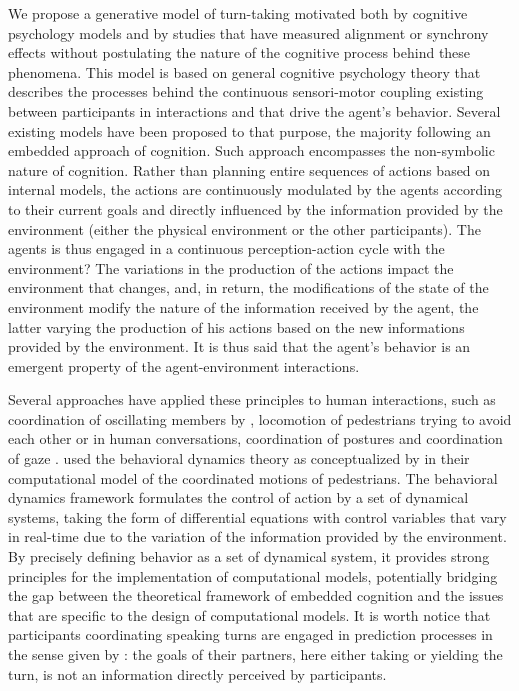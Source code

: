 We propose a generative model of turn-taking motivated both by cognitive psychology models and by studies that have measured alignment or synchrony effects without postulating the nature of the cognitive process behind these phenomena. 
This model is based on general cognitive psychology theory that describes the processes behind the continuous sensori-motor coupling existing between participants in interactions and that drive the agent's behavior. 
Several existing models have been proposed to that purpose, the majority following an embedded approach of cognition. Such approach encompasses the non-symbolic nature of cognition. Rather than planning entire sequences of actions based on internal models, the actions are continuously modulated by the agents according to their current goals and directly influenced by the information provided by the environment (either the physical environment or the other participants). The agents is thus engaged in a continuous perception-action cycle with the environment? The variations in the production of the actions impact the environment that changes, and, in return, the modifications of the state of the environment modify the nature of the information received by the agent, the latter varying the production of his actions based on the new informations provided by the environment. It is thus said that the agent's behavior is an emergent property of the agent-environment interactions. 

Several approaches have applied these principles to human interactions, such as coordination of oscillating members by \citep{haken_theoretical_1985}, locomotion of pedestrians trying to avoid each other \citep{rio_follow_2014} or in human conversations, coordination of postures \citep{fowler_language_2008} and coordination of gaze \citep{richardson_art_2007}. \cite{rio_follow_2014} used the behavioral dynamics theory as conceptualized by \cite{warren_dynamics_2006} in their computational model of the coordinated motions of pedestrians. 
The behavioral dynamics framework formulates the control of action by a set of dynamical systems, taking the form of differential equations with control variables that vary in real-time due to the variation of the information provided by the environment. 
By precisely defining behavior as a set of dynamical system, it provides strong principles for the implementation of computational models, potentially bridging the gap between the theoretical framework of embedded cognition and the issues that are specific to the design of computational models. 
It is worth notice that participants coordinating speaking turns are engaged in prediction processes in the sense given by \citep{warren_dynamics_2006}: the goals of their partners, here either taking or yielding the turn, is not an information directly perceived by participants. 

